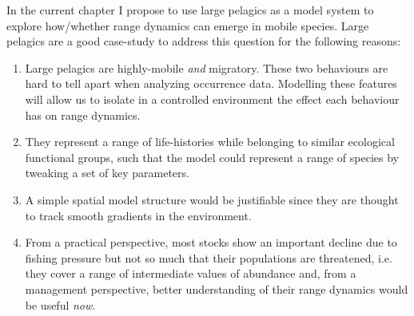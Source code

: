 \documentclass{article}
\begin{document}
In the current chapter I propose to use large pelagics as a model system to
explore how/whether range dynamics can emerge in mobile species. Large pelagics are a good case-study to address this
question for the following reasons:
\begin{enumerate}[--]
\item Large pelagics are highly-mobile \emph{and} migratory. These two
behaviours are hard to tell apart when analyzing occurrence
data. Modelling these features will allow us to isolate in a
controlled environment the effect each behaviour has on range dynamics.
\item They represent a range of
life-histories while belonging to similar ecological functional
groups, such that the model could represent a range of species by
tweaking a set of key parameters.
\item A simple spatial model structure would be justifiable since they
  are thought to track smooth gradients in the environment.
\item From a practical perspective, most stocks show an
important decline due to fishing pressure but not so much that their
populations are threatened, i.e. they cover a range of intermediate
values of abundance and, from a management perspective, better
understanding of their range dynamics would be useful \emph{now}.
\end{enumerate}
\end{document}
